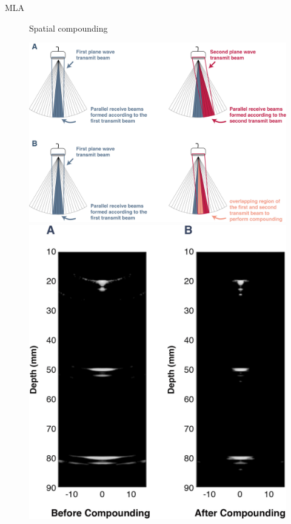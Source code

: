 \documentclass[t,12pt,english
\ifx\beamermode\undefined\else,\beamermode\fi
]{beamer}
\begin{document}
\begin{frame}{MLA }
\begin{figure}[!htb]
\begin{block}{\footnotesize{\tiny Spatial compounding \cite{5}}}
\begin{enumerate}
\end{enumerate}
\end{block}
\endminipage
{}
\centering
\includegraphics[width=1\textwidth]{Compounding.jpg}\\
\includegraphics[width=.5\textwidth]{Compounding1.jpg}\\
\endminipage
\end{figure}


\end{frame}
\end{document}
